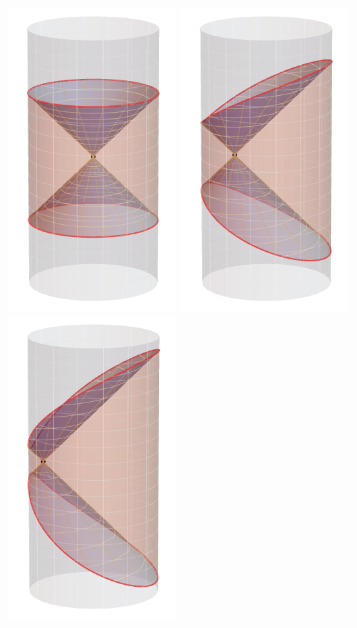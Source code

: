 \documentclass[12pt,openany]{book}
\begin{document}
\begin{figure}[tp]
\begin{center}
\includegraphics[width=1.75in]{figures/TstripS}
\hspace{1cm}
\includegraphics[width=1.75in]{figures/TstripM}
\hspace{1cm}
\includegraphics[width=1.75in]{figures/TstripL}

\end{center}
\end{figure}
\end{document}
